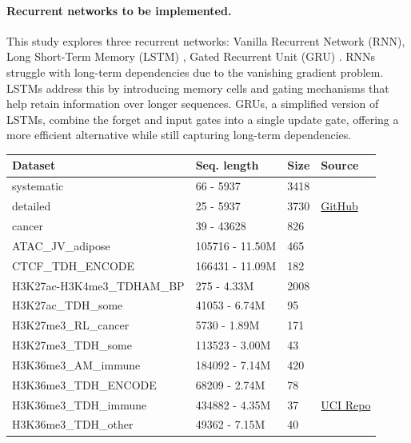 \documentclass[12pt]{article}
\begin{document}
\paragraph{Recurrent networks to be implemented.} This study explores three recurrent networks: Vanilla Recurrent Network (RNN), Long Short-Term Memory (LSTM) \citep{lstm}, Gated Recurrent Unit (GRU) \citep{gru}.
RNNs struggle with long-term dependencies due to the vanishing gradient problem. 
LSTMs address this by introducing memory cells and gating mechanisms that help retain information over longer sequences. 
GRUs, a simplified version of LSTMs, combine the forget and input gates into a single update gate, offering a more efficient alternative while still capturing long-term dependencies.

\begin{table}[t]
\label{tab:datasets_rnn}
\centering
\begin{tabular}{@{}lll|l@{}}
\toprule
\textbf{Dataset} & \textbf{Seq. length} & \textbf{Size} & \textbf{Source} \\
\midrule
systematic & \phantom{0000}66 - 5937 & 3418 & \\
detailed & \phantom{0000}25 - 5937 & 3730 & \href{https://github.com/tdhock/neuroblastoma-data/tree/master/data}{GitHub}\\ 
cancer & \phantom{0000}39 - 43628 & \phantom{0}826 & \\
\midrule
ATAC\_JV\_adipose & 105716 - 11.50M & \phantom{0}465 \\
CTCF\_TDH\_ENCODE & 166431 - 11.09M & \phantom{0}182 \\
H3K27ac-H3K4me3\_TDHAM\_BP & \phantom{000}275 -\phantom{0} 4.33M & 2008 \\
H3K27ac\_TDH\_some & \phantom{0}41053 -\phantom{0} 6.74M & \phantom{00}95 \\
H3K27me3\_RL\_cancer & \phantom{00}5730 -\phantom{0} 1.89M & \phantom{0}171 \\
H3K27me3\_TDH\_some & 113523 -\phantom{0} 3.00M & \phantom{00}43 \\
H3K36me3\_AM\_immune & 184092 -\phantom{0} 7.14M & \phantom{0}420 \\
H3K36me3\_TDH\_ENCODE & \phantom{0}68209 -\phantom{0} 2.74M & \phantom{00}78 \\
H3K36me3\_TDH\_immune & 434882 -\phantom{0} 4.35M & \phantom{00}37 & \href{https://archive.ics.uci.edu/ml/machine-learning-databases/00439/peak-detection-data.tar.xz}{UCI Repo}\\
H3K36me3\_TDH\_other & \phantom{0}49362 -\phantom{0} 7.15M & \phantom{00}40 \\

\end{tabular}
\end{table}
\end{document}
